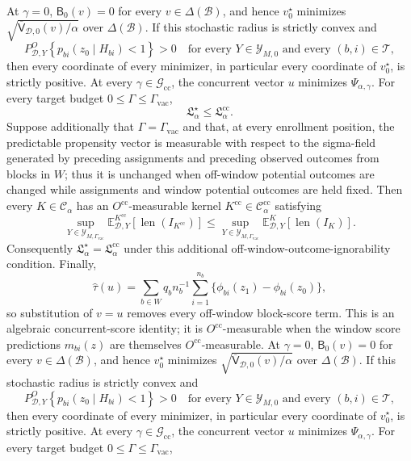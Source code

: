 At \(\gamma=0\), \(\mathsf B_0(v)=0\) for every \(v\in\Delta(\mathcal B)\), and hence \(v_0^\star\) minimizes \(\sqrt{\overline{\mathsf V}_{\mathcal D,0}(v)/\alpha}\) over \(\Delta(\mathcal B)\).  If this stochastic radius is strictly convex and
\[
 P^O_{\mathcal D,Y}\!\left\{p_{bi}(z_0\mid H_{bi})<1\right\}>0
 \quad\text{for every }Y\in\mathcal Y_{M,0}\text{ and every }(b,i)\in\mathcal T,
\]
then every coordinate of every minimizer, in particular every coordinate of \(v_0^\star\), is strictly positive.  At every \(\gamma\in\mathcal G_{\mathrm{cc}}\), the concurrent vector \(u\) minimizes \(\Psi_{\alpha,\gamma}\).  For every target budget \(0\le\Gamma\le\Gamma_{\mathrm{vac}}\),
\[
 \mathfrak L_\alpha^\star\le\mathfrak L_\alpha^{\mathrm{cc}}.
\]
Suppose additionally that \(\Gamma=\Gamma_{\mathrm{vac}}\) and that, at every enrollment position, the predictable propensity vector is measurable with respect to the sigma-field generated by preceding assignments and preceding observed outcomes from blocks in \(W\); thus it is unchanged when off-window potential outcomes are changed while assignments and window potential outcomes are held fixed.  Then every \(K\in\mathcal C_\alpha\) has an \(O^{\mathrm{cc}}\)-measurable kernel \(K^{\mathrm{cc}}\in\mathcal C_\alpha^{\mathrm{cc}}\) satisfying
\[
 \sup_{Y\in\mathcal Y_{M,\Gamma_{\mathrm{vac}}}}
 \mathbb E^{K^{\mathrm{cc}}}_{\mathcal D,Y}[\operatorname{len}(I_{K^{\mathrm{cc}}})]
 \le
 \sup_{Y\in\mathcal Y_{M,\Gamma_{\mathrm{vac}}}}
 \mathbb E^K_{\mathcal D,Y}[\operatorname{len}(I_K)].
\]
Consequently \(\mathfrak L_\alpha^\star=\mathfrak L_\alpha^{\mathrm{cc}}\) under this additional off-window-outcome-ignorability condition.  Finally,
\[
 \widehat\tau(u)=
 \sum_{b\in W}q_b n_b^{-1}\sum_{i=1}^{n_b}
 \{\phi_{bi}(z_1)-\phi_{bi}(z_0)\},
\]
so substitution of \(v=u\) removes every off-window block-score term.  This is an algebraic concurrent-score identity; it is \(O^{\mathrm{cc}}\)-measurable when the window score predictions \(m_{bi}(z)\) are themselves \(O^{\mathrm{cc}}\)-measurable.
At \(\gamma=0\), \(\mathsf B_0(v)=0\) for every \(v\in\Delta(\mathcal B)\), and hence \(v_0^\star\) minimizes \(\sqrt{\overline{\mathsf V}_{\mathcal D,0}(v)/\alpha}\) over \(\Delta(\mathcal B)\).  If this stochastic radius is strictly convex and
\[
 P^O_{\mathcal D,Y}\!\left\{p_{bi}(z_0\mid H_{bi})<1\right\}>0
 \quad\text{for every }Y\in\mathcal Y_{M,0}\text{ and every }(b,i)\in\mathcal T,
\]
then every coordinate of every minimizer, in particular every coordinate of \(v_0^\star\), is strictly positive.  At every \(\gamma\in\mathcal G_{\mathrm{cc}}\), the concurrent vector \(u\) minimizes \(\Psi_{\alpha,\gamma}\).  For every target budget \(0\le\Gamma\le\Gamma_{\mathrm{vac}}\),

